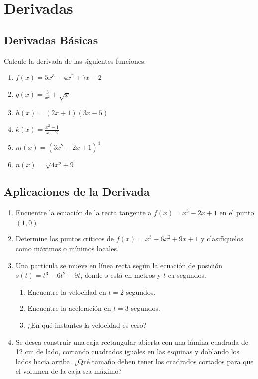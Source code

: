 \documentclass[12pt,a4paper]{article}
\begin{document}
\section{Derivadas}

\subsection{Derivadas Básicas}
Calcule la derivada de las siguientes funciones:

\begin{enumerate}
    \item $f(x) = 5x^3 - 4x^2 + 7x - 2$
    \item $g(x) = \frac{3}{x^2} + \sqrt{x}$
    \item $h(x) = (2x + 1)(3x - 5)$
    \item $k(x) = \frac{x^2 + 1}{x - 2}$
    \item $m(x) = (3x^2 - 2x + 1)^4$
    \item $n(x) = \sqrt{4x^2 + 9}$
\end{enumerate}

\subsection{Aplicaciones de la Derivada}
\begin{enumerate}
    \item Encuentre la ecuación de la recta tangente a $f(x) = x^3 - 2x + 1$ en el punto $(1, 0)$.
    
    \item Determine los puntos críticos de $f(x) = x^3 - 6x^2 + 9x + 1$ y clasifíquelos como máximos o mínimos locales.
    
    \item Una partícula se mueve en línea recta según la ecuación de posición $s(t) = t^3 - 6t^2 + 9t$, donde $s$ está en metros y $t$ en segundos.
    \begin{enumerate}
        \item Encuentre la velocidad en $t = 2$ segundos.
        \item Encuentre la aceleración en $t = 3$ segundos.
        \item ¿En qué instantes la velocidad es cero?
    \end{enumerate}
    
    \item Se desea construir una caja rectangular abierta con una lámina cuadrada de 12 cm de lado, cortando cuadrados iguales en las esquinas y doblando los lados hacia arriba. ¿Qué tamaño deben tener los cuadrados cortados para que el volumen de la caja sea máximo?
\end{enumerate}
\end{document}
